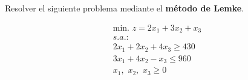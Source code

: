 Resolver el siguiente problema mediante el \textbf{método de Lemke}.

\begin{equation}
\begin{split}
\mbox{min. } z = 2x_1 + 3x_2 + x_3\\
s.a.:\\
2x_1 + 2x_2 + 4x_3 \geq 430\\
3x_1 + 4x_2 -  x_3 \leq 960\\
x_1,\,\,x_2,\,\,x_3\geq 0\\
\end{split}
\end{equation}